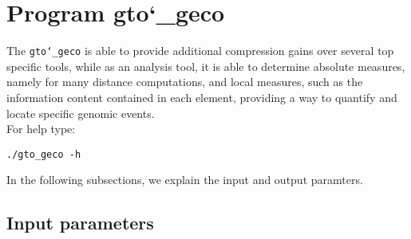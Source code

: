 \section{Program gto\char`_geco}
The \texttt{gto\char`_geco} is able to provide additional compression gains over several top specific tools, while as an analysis tool, it is able to determine absolute measures, namely for many distance computations, and local measures, such as the information content contained in each element, providing a way to quantify and locate specific genomic events.\\
For help type:
\begin{lstlisting}
./gto_geco -h
\end{lstlisting}
In the following subsections, we explain the input and output paramters.

\subsection*{Input parameters}

